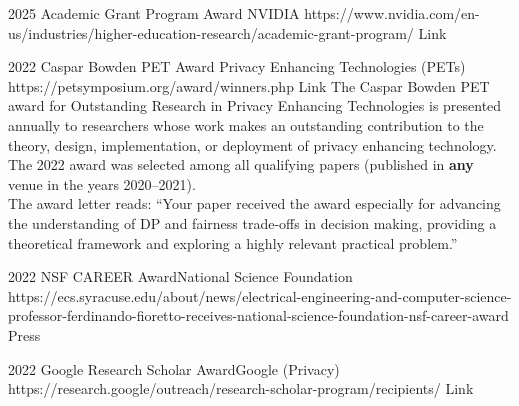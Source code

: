

\begin{awards}
	\awardentry
	{2025}
	{Academic Grant Program Award}
	{NVIDIA}
	{https://www.nvidia.com/en-us/industries/higher-education-research/academic-grant-program/}
	{Link}

	\awardentryD
	{2022}
	{Caspar Bowden PET Award}%
	{Privacy Enhancing Technologies (PETs)}
	{https://petsymposium.org/award/winners.php}
	{Link}
	{The Caspar Bowden PET award for Outstanding Research in Privacy Enhancing Technologies is presented annually to researchers
	whose work makes an outstanding contribution to the theory, design, implementation, or deployment of privacy enhancing technology. The 2022 award was selected among all qualifying papers (published in \textbf{any} venue in the years 2020--2021).\\
	The award letter reads: ``Your paper  received the award especially for advancing the understanding of DP and fairness trade-offs in decision making, providing a theoretical framework and exploring a highly relevant practical problem.''}

	\awardentry
	{2022}
	{NSF CAREER Award}{National Science Foundation}
	{https://ecs.syracuse.edu/about/news/electrical-engineering-and-computer-science-professor-ferdinando-fioretto-receives-national-science-foundation-nsf-career-award}
	{Press}

	\awardentry
	{2022}
	{Google Research Scholar Award}{Google (Privacy)}
	{https://research.google/outreach/research-scholar-program/recipients/}
	{Link}


\end{awards}
